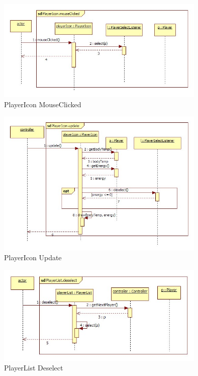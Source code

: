 \begin{figure}[H]
	\begin{center}
		\includegraphics[width=10cm]{chapters/chapter11/seq/PlayerIcon_mouseClicked.jpg}
		\caption{PlayerIcon MouseClicked}
		\label{PlayerIcon MouseClicked}
	\end{center}
\end{figure}
\begin{figure}[H]
	\begin{center}
		\includegraphics[width=10cm]{chapters/chapter11/seq/PlayerIcon_update.jpg}
		\caption{PlayerIcon Update}
		\label{PlayerIcon Update}
	\end{center}
\end{figure}
\begin{figure}[H]
	\begin{center}
		\includegraphics[width=10cm]{chapters/chapter11/seq/PlayerList_deselect.jpg}
		\caption{PlayerList Deselect}
		\label{PlayerList Deselect}
	\end{center}
\end{figure}
